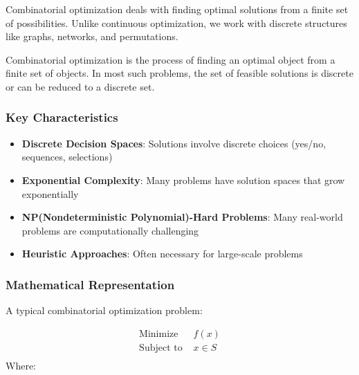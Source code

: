 \documentclass[
  letterpaper,
  DIV=11,
  numbers=noendperiod]{scrreprt}
\providecommand{\tightlist}{%
  \setlength{\itemsep}{0pt}\setlength{\parskip}{0pt}}
\begin{document}
Combinatorial optimization deals with finding optimal solutions from a
finite set of possibilities. Unlike continuous optimization, we work
with discrete structures like graphs, networks, and permutations.

\begin{tcolorbox}[enhanced jigsaw, leftrule=.75mm, rightrule=.15mm, colback=white, colbacktitle=quarto-callout-note-color!10!white, arc=.35mm, opacityback=0, toptitle=1mm, bottomrule=.15mm, bottomtitle=1mm, titlerule=0mm, title=\textcolor{quarto-callout-note-color}{\faInfo}\hspace{0.5em}{Formal Definition:}, toprule=.15mm, left=2mm, coltitle=black, breakable, colframe=quarto-callout-note-color-frame, opacitybacktitle=0.6]

Combinatorial optimization is the process of finding an optimal object
from a finite set of objects. In most such problems, the set of feasible
solutions is discrete or can be reduced to a discrete set.

\end{tcolorbox}

\subsubsection{Key Characteristics}\label{key-characteristics}

\begin{itemize}
\tightlist
\item
  \textbf{Discrete Decision Spaces}: Solutions involve discrete choices
  (yes/no, sequences, selections)
\item
  \textbf{Exponential Complexity}: Many problems have solution spaces
  that grow exponentially
\item
  \textbf{NP(Nondeterministic Polynomial)-Hard Problems}: Many
  real-world problems are computationally challenging
\item
  \textbf{Heuristic Approaches}: Often necessary for large-scale
  problems
\end{itemize}

\subsubsection{Mathematical
Representation}\label{mathematical-representation-1}

A typical combinatorial optimization problem:

\[
\begin{aligned}
\text{Minimize } & f(x) \\
\text{Subject to } & x \in S \\
\end{aligned}
\] Where:
\end{document}
